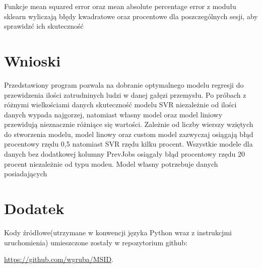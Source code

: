 \documentclass[10pt]{article}
\begin{document}
Funkcje mean squared error oraz mean absolute percentage error z modułu sklearn wyliczają błędy kwadratowe oraz procentowe dla poszczególnych sesji, aby sprawidzć ich skuteczność

\section{Wnioski}
Przedstawiony program pozwala na dobranie optymalnego modelu regresji do przewidzenia ilości zatrudninych ludzi w danej gałęzi przemysłu. Po próbach z różnymi wielkościami danych skuteczność modelu SVR niezależnie od ilości danych wypada najgorzej, natomiast własny model oraz model liniowy przewidują nieznacznie różniące się wartości.
Zależnie od liczby wierszy wziętych do stworzenia modelu, model linowy oraz custom model zazwyczaj osiągają błąd procentowy rzędu 0,5 natomiast SVR rzędu kilku procent.
Wszystkie modele dla danych bez dodatkowej kolumny PrevJobs osiągały błąd procentowy rzędu 20 procent niezależnie od typu modeu.
Model własny potrzebuje danych posiadających 

    

\appendix
\section{Dodatek}
Kody źródłowe(utrzymane w konwencji języka Python wraz z instrukcjmi uruchomienia) umieszczone zostały w repozytorium github:

\noindent \url{https://github.com/wgruba/MSID}.
\end{document}
